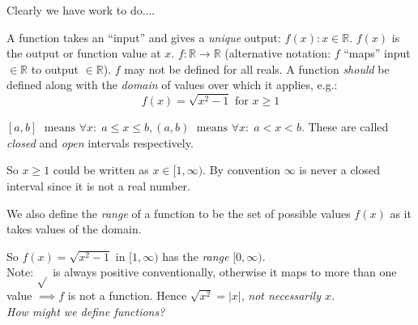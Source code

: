 \documentclass[10pt]{scrartcl}
\begin{document}
Clearly we have work to do....




\pagebreak

A function  
 takes an ``input'' and gives a \emph{unique} output: $f(x) : x \in \mathbb{R}.$ $f(x)$ is the output or function value at $x$. $f:\mathbb{R} \rightarrow \mathbb{R}$ (alternative notation: $f$ ``maps'' input $\in \mathbb{R}$ to output $\in \mathbb{R}$). $f$ may not be defined for all reals. A function \textit{should} be defined along with the \emph{domain} of values over which it applies, e.g.:
\[f(x) = \sqrt{x^2 -1}\text{ for } x \geq 1\]

\begin{definition}
	 $[a,b] \; \text{ means } \forall x : \; a \leq x \leq b, (a,b) \; \text{ means } \forall x : \; a < x < b$.
These are called \emph{closed} and \emph{open} intervals respectively. 

\end{definition}


So $x \geq 1$ could be written as $x \in [1,\infty)$. By convention $\infty$ is never a closed interval since it is not a real number.\\

\begin{definition}
We also define the \emph{range} of a function to be the set of possible values $f(x)$ as it takes values of the domain.
\end{definition}
So $f(x) = \sqrt{x^2 -1 }$ in $[1,\infty)$ has the \emph{range} $[0,\infty)$.\\

Note: $\sqrt{}$ is always positive conventionally, otherwise it maps to more than one value $\implies f$ is not a function. Hence $\sqrt{x^2} = |x|$, \textit{not necessarily $x$.}\\


\emph{How might we define functions?}
\end{document}
